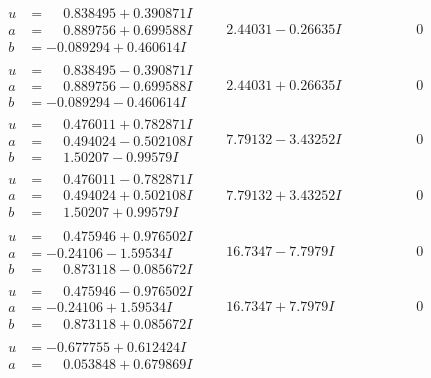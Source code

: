\documentclass[1p]{elsarticle_modified}
\theoremstyle{definition}
\begin{document}
$$\begin{array}{c|c|c}
\begin{aligned}
u &= \phantom{-}0.838495 + 0.390871 I \\
a &= \phantom{-}0.889756 + 0.699588 I \\
b &= -0.089294 + 0.460614 I\end{aligned}
 & \phantom{-}2.44031 - 0.26635 I & \phantom{-0.000000 } 0 \\ \hline\begin{aligned}
u &= \phantom{-}0.838495 - 0.390871 I \\
a &= \phantom{-}0.889756 - 0.699588 I \\
b &= -0.089294 - 0.460614 I\end{aligned}
 & \phantom{-}2.44031 + 0.26635 I & \phantom{-0.000000 } 0 \\ \hline\begin{aligned}
u &= \phantom{-}0.476011 + 0.782871 I \\
a &= \phantom{-}0.494024 - 0.502108 I \\
b &= \phantom{-}1.50207 - 0.99579 I\end{aligned}
 & \phantom{-}7.79132 - 3.43252 I & \phantom{-0.000000 } 0 \\ \hline\begin{aligned}
u &= \phantom{-}0.476011 - 0.782871 I \\
a &= \phantom{-}0.494024 + 0.502108 I \\
b &= \phantom{-}1.50207 + 0.99579 I\end{aligned}
 & \phantom{-}7.79132 + 3.43252 I & \phantom{-0.000000 } 0 \\ \hline\begin{aligned}
u &= \phantom{-}0.475946 + 0.976502 I \\
a &= -0.24106 - 1.59534 I \\
b &= \phantom{-}0.873118 - 0.085672 I\end{aligned}
 & \phantom{-}16.7347 - 7.7979 I & \phantom{-0.000000 } 0 \\ \hline\begin{aligned}
u &= \phantom{-}0.475946 - 0.976502 I \\
a &= -0.24106 + 1.59534 I \\
b &= \phantom{-}0.873118 + 0.085672 I\end{aligned}
 & \phantom{-}16.7347 + 7.7979 I & \phantom{-0.000000 } 0 \\ \hline\begin{aligned}
u &= -0.677755 + 0.612424 I \\
a &= \phantom{-}0.053848 + 0.679869 I \\

\end{aligned}
\end{array}$$
\end{document}
